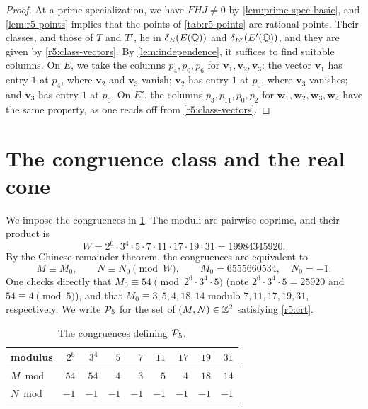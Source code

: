 \begin{proof}
At a prime specialization, we have $FHJ\ne0$ by \cref{lem:prime-spec-basic}, and \cref{lem:r5-points} implies that the points of \cref{tab:r5-points} are rational points. Their classes, and those of $T$ and $T'$, lie in $\delta_E(E(\mathbb Q))$ and $\delta_{E'}(E'(\mathbb Q))$, and they are given by \eqref{r5:class-vectors}. By \cref{lem:independence}, it suffices to find suitable columns. On $E$, we take the columns $p_4,p_0,p_6$ for $\mathbf v_1,\mathbf v_2,\mathbf v_3$: the vector $\mathbf v_1$ has entry $1$ at $p_4$, where $\mathbf v_2$ and $\mathbf v_3$ vanish; $\mathbf v_2$ has entry $1$ at $p_0$, where $\mathbf v_3$ vanishes; and $\mathbf v_3$ has entry $1$ at $p_6$. On $E'$, the columns $p_3,p_{11},p_0,p_2$ for $\mathbf w_1,\mathbf w_2,\mathbf w_3,\mathbf w_4$ have the same property, as one reads off from \eqref{r5:class-vectors}.
\end{proof}

\section{The congruence class and the real cone}\label{sec:r5-progression}

We impose the congruences in \cref{tab:r5-crt}. The moduli are pairwise coprime, and their product is
\[
W=2^6\cdot3^4\cdot5\cdot7\cdot11\cdot17\cdot19\cdot31=19984345920.
\]
By the Chinese remainder theorem, the congruences are equivalent to
\begin{equation}\label{r5:crt}
M\equiv M_0,\qquad N\equiv N_0\pmod W,\qquad M_0=6555660534,\quad N_0=-1.
\end{equation}
One checks directly that $M_0\equiv54\pmod{2^6\cdot3^4\cdot5}$ (note $2^6\cdot3^4\cdot5=25920$ and $54\equiv4\pmod5$), and that $M_0\equiv3,5,4,18,14$ modulo $7,11,17,19,31$, respectively. We write $\mathcal P_5$ for the set of $(M,N)\in\mathbb Z^2$ satisfying \eqref{r5:crt}.

\begin{table}[htbp]
\centering
\caption{The congruences defining $\mathcal P_5$.}\label{tab:r5-crt}
\begin{tabular}{l*{8}{r}}
\toprule
modulus & $2^6$ & $3^4$ & $5$ & $7$ & $11$ & $17$ & $19$ & $31$\\
\midrule
$M\bmod{}$ & $54$ & $54$ & $4$ & $3$ & $5$ & $4$ & $18$ & $14$\\
$N\bmod{}$ & $-1$ & $-1$ & $-1$ & $-1$ & $-1$ & $-1$ & $-1$ & $-1$\\
\bottomrule
\end{tabular}
\end{table}


